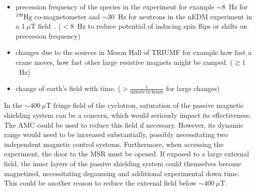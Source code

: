 \begin{itemize}
    \item  precession frequency of the species in the experiment for example $\sim8$~Hz for $\mathrm{^{199}Hg}$ co-magnetometer and $\sim30$~Hz for neutrons in the nEDM experiment in a $1~\mu$T field~\cite{bea_paper}. ($<8$~Hz to reduce potential of inducing spin flips or shifts on precession frequency)
    \item  changes due to the sources in Meson Hall of TRIUMF for example how fast a crane moves, how fast other large resistive magnets might be ramped. ($\gtrsim1$~Hz)
    \item  change of earth's field with time. ($>\frac{1}{\mathrm{minute~to~hours}}$ for large changes)
\end{itemize}






In the $\sim400~\mu$T fringe field of the cyclotron, saturation of the passive magnetic shielding system can be a concern, which would seriously impact its effectiveness. The AMC could be used to reduce this field if necessary. However, its dynamic range would need to be increased substantially, possibly necessitating two independent magnetic control systems. Furthermore, when accessing the experiment, the door to the MSR must be opened. If exposed to a large external field, the inner layers of the passive shielding system could themselves become magnetized, necessitating degaussing and additional experimental down time. This could be another reason to reduce the external field below $\sim400~\mu$T.

